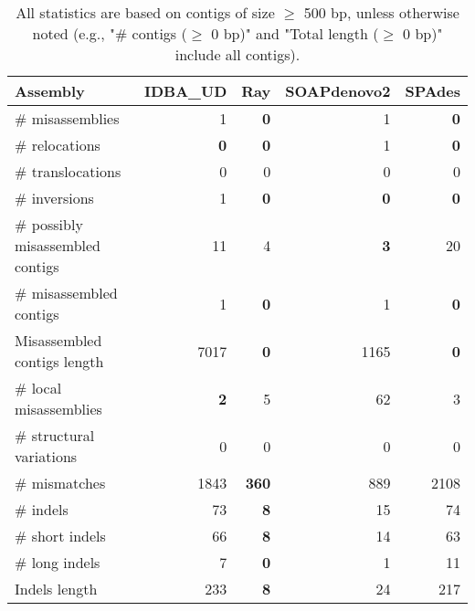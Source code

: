 \documentclass[12pt,a4paper]{article}
\begin{document}
\begin{table}[ht]
\begin{center}
\caption{All statistics are based on contigs of size $\geq$ 500 bp, unless otherwise noted (e.g., "\# contigs ($\geq$ 0 bp)" and "Total length ($\geq$ 0 bp)" include all contigs).}
\begin{tabular}{|l*{4}{|r}|}
\hline
Assembly & IDBA\_UD & Ray & SOAPdenovo2 & SPAdes \\ \hline
\# misassemblies & 1 & {\bf 0} & 1 & {\bf 0} \\ \hline
\hspace{5mm}\# relocations & {\bf 0} & {\bf 0} & 1 & {\bf 0} \\ \hline
\hspace{5mm}\# translocations & 0 & 0 & 0 & 0 \\ \hline
\hspace{5mm}\# inversions & 1 & {\bf 0} & {\bf 0} & {\bf 0} \\ \hline
\# possibly misassembled contigs & 11 & 4 & {\bf 3} & 20 \\ \hline
\# misassembled contigs & 1 & {\bf 0} & 1 & {\bf 0} \\ \hline
Misassembled contigs length & 7017 & {\bf 0} & 1165 & {\bf 0} \\ \hline
\# local misassemblies & {\bf 2} & 5 & 62 & 3 \\ \hline
\# structural variations & 0 & 0 & 0 & 0 \\ \hline
\# mismatches & 1843 & {\bf 360} & 889 & 2108 \\ \hline
\# indels & 73 & {\bf 8} & 15 & 74 \\ \hline
\hspace{5mm}\# short indels & 66 & {\bf 8} & 14 & 63 \\ \hline
\hspace{5mm}\# long indels & 7 & {\bf 0} & 1 & 11 \\ \hline
Indels length & 233 & {\bf 8} & 24 & 217 \\ \hline
\end{tabular}
\end{center}
\end{table}
\end{document}
